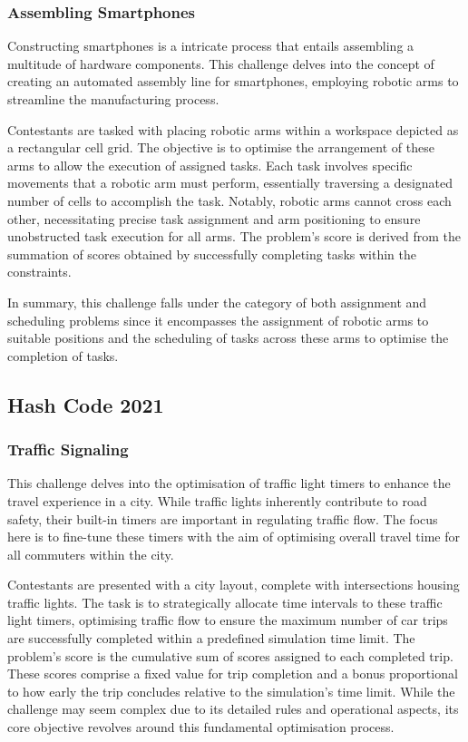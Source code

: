 \subsubsection*{Assembling Smartphones}
\label{subsubsec:hashcode-2020-final}

Constructing smartphones is a intricate process that entails assembling a
multitude of hardware components. This challenge delves into the concept of
creating an automated assembly line for smartphones, employing robotic arms to
streamline the manufacturing process.

Contestants are tasked with placing robotic arms within a workspace depicted as
a rectangular cell grid. The objective is to optimise the arrangement of these
arms to allow the execution of assigned tasks. Each task involves specific
movements that a robotic arm must perform, essentially traversing a designated
number of cells to accomplish the task. Notably, robotic arms cannot cross each
other, necessitating precise task assignment and arm positioning to ensure
unobstructed task execution for all arms. The problem's score is derived from
the summation of scores obtained by successfully completing tasks within the
constraints.

In summary, this challenge falls under the category of both assignment and
scheduling problems since it encompasses the assignment of robotic arms to
suitable positions and the scheduling of tasks across these arms to optimise the
completion of tasks.

\subsection{Hash Code 2021}
\label{subsec:hashcode-2021}

\subsubsection*{Traffic Signaling}
\label{subsubsec:hashcode-2021-qualification}

This challenge delves into the optimisation of traffic light timers to enhance
the travel experience in a city. While traffic lights inherently contribute to
road safety, their built-in timers are important in regulating traffic flow. The
focus here is to fine-tune these timers with the aim of optimising overall
travel time for all commuters within the city.

Contestants are presented with a city layout, complete with intersections
housing traffic lights. The task is to strategically allocate time intervals to
these traffic light timers, optimising traffic flow to ensure the maximum number
of car trips are successfully completed within a predefined simulation time
limit. The problem's score is the cumulative sum of scores assigned to each
completed trip. These scores comprise a fixed value for trip completion and a
bonus proportional to how early the trip concludes relative to the simulation's
time limit. While the challenge may seem complex due to its detailed rules and
operational aspects, its core objective revolves around this fundamental
optimisation process.

